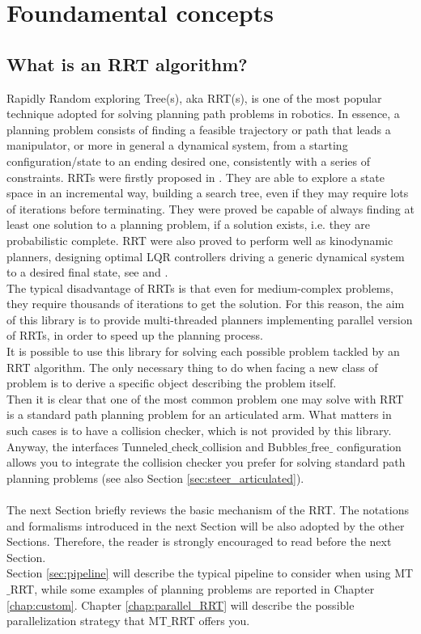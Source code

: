 \chapter{Foundamental concepts}

\section{What is an RRT algorithm?}

Rapidly Random exploring Tree(s), aka RRT(s), is one of the most popular technique adopted for solving planning path problems in robotics.
In essence, a planning problem consists of finding a feasible trajectory or path that leads a manipulator, or more in general a dynamical system, from a starting configuration/state to an ending desired one, consistently with a series of constraints.
RRTs were firstly proposed in \cite{RRT_LaValle}. They are able to explore a state space in an incremental way, building a search tree, even if they may require lots of iterations before terminating. They were proved be capable of always finding at least one solution to a planning problem, if a solution exists, i.e. they are probabilistic complete.
RRT were also proved to perform well as kinodynamic planners, designing optimal LQR controllers driving a generic dynamical system to a desired final state, see \cite{LQR_RRT_01} and  \cite{LQR_RRT_02}.
\\
The typical disadvantage of RRTs is that even for medium-complex problems, they require thousands of iterations to get the solution. 
For this reason, the aim of this library is to provide multi-threaded planners implementing parallel version of RRTs, in order to speed up the planning process. 
\\
It is possible to use this library for solving each possible problem tackled by an RRT algorithm. The only necessary thing to do when facing a new class of problem is to derive a specific object describing the problem itself. 
\\
Then it is clear that one of the most common problem one may solve with RRT is a standard path planning problem for an articulated arm.
What matters in such cases is to have a collision checker, which is not provided by this library. Anyway, the interfaces Tunneled$\_$check$\_$collision and Bubbles$\_$free$\_$ configuration allows you to integrate the collision checker you prefer for solving standard path planning problems (see also Section \ref{sec:steer_articulated}).
\\
\\
The next Section briefly reviews the basic mechanism of the RRT. The notations and formalisms introduced in the next Section will be also adopted by the other Sections. Therefore, the reader is strongly encouraged to read before the next Section.
\\
Section \ref{sec:pipeline} will describe the typical pipeline to consider when using MT$\_$RRT, while some examples of planning problems are reported in Chapter \ref{chap:custom}. Chapter \ref{chap:parallel_RRT} will describe the possible parallelization strategy that MT$\_$RRT offers you.

